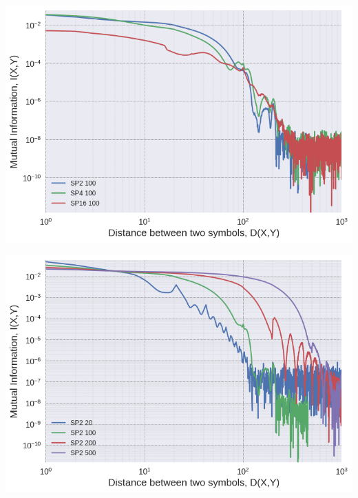 \documentclass[a0,portrait]{a0poster}
\begin{document}
\begin{multicols}{2}
\begin{center}
\begin{minipage}[b]{0.4\linewidth}
\centering
\includegraphics[width=\textwidth]{spk_k.png}
\label{fig:spk_k}
\end{minipage}
\hspace{0.5cm}
\begin{minipage}[b]{0.4\linewidth}
\centering
\includegraphics[width=\textwidth]{spk_len.png}
\label{fig:spk_len}
\end{minipage}
\end{center}


\end{multicols}
\end{document}
